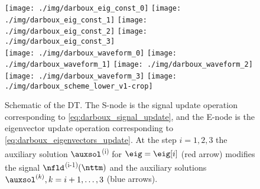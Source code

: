 \begin{figure}[t]
  \centering
  \texttt{[image: ./img/darboux\_eig\_const\_0]}
  \texttt{[image: ./img/darboux\_eig\_const\_1]}
  \texttt{[image: ./img/darboux\_eig\_const\_2]}
  \texttt{[image: ./img/darboux\_eig\_const\_3]}
  \\
  \texttt{[image: ./img/darboux\_waveform\_0]}
  \texttt{[image: ./img/darboux\_waveform\_1]}
  \texttt{[image: ./img/darboux\_waveform\_2]}
  \texttt{[image: ./img/darboux\_waveform\_3]}
  \texttt{[image: ./img/darboux\_scheme\_lower\_v1-crop]}
  \caption{Schematic of the \ac{DT}. The S-node is the signal update operation
    corresponding to \eqref{eq:darboux_signal_update}, and the E-node is the
    eigenvector update operation corresponding to
\eqref{eq:darboux_eigenvectors_update}. At
the step $i=1,2,3$ the auxiliary solution $\auxsol$\textsuperscript{(i)} for
$\eig = \eig[i]$ (red arrow) modifies the signal $\nfld$\textsuperscript{(i-1)}$(\nttm)$
and the auxiliary solutions $\auxsol^{(k)}, k=i+1,\dots,3$ (blue arrows). %
}
  \label{fig:darbouxlower}
\end{figure}

